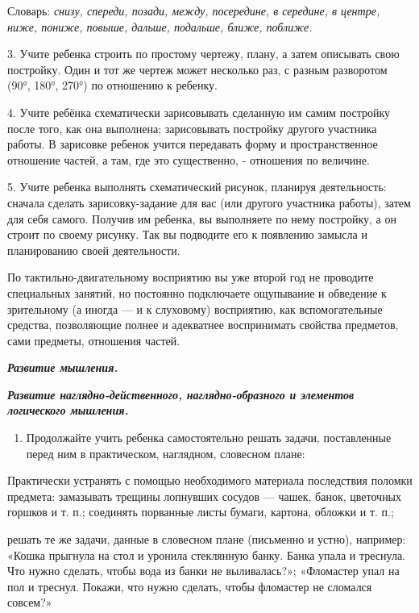 \documentclass{book}
\renewcommand{\emph}[1]{\textit{#1}}
\begin{document}
Словарь: \emph{снизу, спереди, позади, между, посередине, в середине, в
центре, ниже, пониже, повыше, дальше, подальше, ближе, поближе.}

3. Учите ребенка строить по простому чертежу, плану, а затем описывать
свою постройку. Один и тот же чертеж может несколько раз, с разным
разворотом (90°, 180°, 270°) по отношению к ребенку.

4. Учите ребёнка схематически зарисовывать сделанную им самим постройку
после того, как она выполнена; зарисовывать постройку другого участника
работы. В зарисовке ребенок учится передавать форму и пространственное
отношение частей, а там, где это существенно, - отношения по величине.

5. Учите ребенка выполнять схематический рисунок, планируя деятельность:
сначала сделать зарисовку-задание для вас (или другого участника
работы), затем для себя самого. Получив им ребенка, вы выполняете по
нему постройку, а он строит по своему рисунку. Так вы подводите его к
появлению замысла и планированию своей деятельности.

По тактильно-двигательному восприятию вы уже второй год не проводите
специальных занятий, но постоянно подключаете ощупывание и обведение к
зрительному (а иногда --- и к слуховому) восприятию, как вспомогательные
средства, позволяющие полнее и адекватнее воспринимать свойства
предметов, сами предметы, отношения частей.

\emph{\textbf{Развитие мышления.}}

\emph{\textbf{Развитие наглядно-действенного, наглядно-образного и
элементов логического мышления.}}


\begin{enumerate}
\def\labelenumi{\arabic{enumi}.}
\item
  
  Продолжайте учить ребенка самостоятельно решать задачи, поставленные
  перед ним в практическом, наглядном, словесном плане:
  
\end{enumerate}


Практически устранять с помощью необходимого материала последствия
поломки предмета: замазывать трещины лопнувших сосудов --- чашек, банок,
цветочных горшков и т. п.; соединять порванные листы бумаги, картона,
обложки и т. п.;

решать те же задачи, данные в словесном плане (письменно и устно),
например: «Кошка прыгнула на стол и уронила стеклянную банку. Банка
упала и треснула. Что нужно сделать, чтобы вода из банки не
выливалась?»; «Фломастер упал на пол и треснул. Покажи, что нужно
сделать, чтобы фломастер не сломался совсем?»
\end{document}
